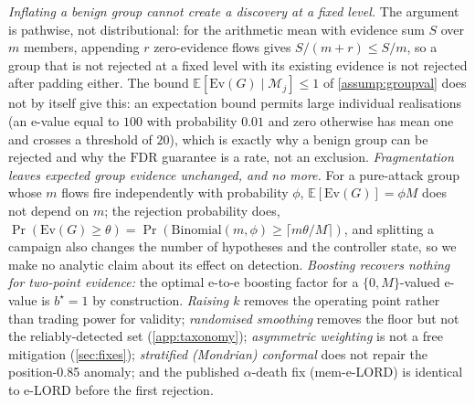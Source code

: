 \documentclass[conference]{IEEEtran}
\newcommand{\ceil}{M}
\newcommand{\Ev}{\mathrm{Ev}}
\newcommand{\FDR}{\mathrm{FDR}}
\begin{document}
\emph{Inflating a benign group cannot create a discovery at a fixed level.} The argument is pathwise,
not distributional: for the arithmetic mean with evidence sum $S$ over $m$ members, appending $r$
zero-evidence flows gives $S/(m+r)\le S/m$, so a group that is not rejected at a fixed level with its
existing evidence is not rejected after padding either. The bound $\mathbb E[\Ev(G)\mid\mathcal M_j]\le1$
of \cref{assump:groupval} does not by itself give this: an expectation bound permits large individual
realisations (an e-value equal to $100$ with probability $0.01$ and zero otherwise has mean one and
crosses a threshold of $20$), which is exactly why a benign group can be rejected and why the
$\FDR$ guarantee is a rate, not an exclusion. \emph{Fragmentation leaves expected group evidence
unchanged, and no more.} For a pure-attack group whose $m$ flows fire independently with probability
$\phi$, $\mathbb E[\Ev(G)]=\phi\ceil$ does not depend on $m$; the rejection probability does,
$\Pr(\Ev(G)\ge\theta)=\Pr(\mathrm{Binomial}(m,\phi)\ge\lceil m\theta/\ceil\rceil)$, and splitting a
campaign also changes the number of hypotheses and the controller state, so we make no analytic claim
about its effect on detection. \emph{Boosting recovers nothing for two-point evidence:} the
optimal e-to-e boosting factor for a $\{0,\ceil\}$-valued e-value is $b^{\star}=1$ by construction.
\emph{Raising $k$} removes the operating point rather than trading power for validity; \emph{randomised
smoothing} removes the floor but not the reliably-detected set (\cref{app:taxonomy}); \emph{asymmetric
weighting} is not a free mitigation (\cref{sec:fixes}); \emph{stratified (Mondrian) conformal} does not
repair the position-0.85 anomaly; and the published $\alpha$-death fix (mem-e-LORD) is identical to e-LORD
before the first rejection.
\end{document}
